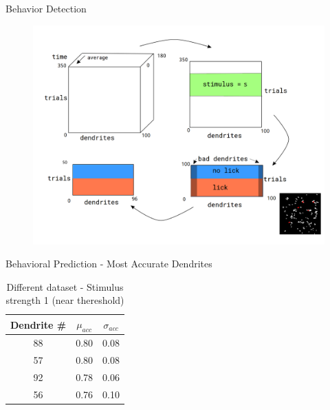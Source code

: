 \documentclass[10pt]{beamer}
\begin{document}


\begin{frame}[fragile]{Behavior Detection}
\begin{center}
	\begin{figure}
      \includegraphics[width=1.0\textwidth]{data_hm.png}
	\end{figure}
	\end{center}
\end{frame}

\begin{frame}[fragile]{Behavioral Prediction - Most Accurate Dendrites}
\begin{table}
    \caption*{Different dataset - Stimulus strength 1 (near thereshold)}
    \begin{tabular}{c|c|c}
      \toprule
      Dendrite \# & $\mu_{acc}$ & $\sigma_{acc}$\\
      \midrule
      88 & 0.80 & 0.08\\
      57 & 0.80 & 0.08\\
      92 & 0.78 & 0.06\\
      56 & 0.76 & 0.10\\
      \bottomrule
    \end{tabular}
  \end{table}
\end{frame}
\end{document}
